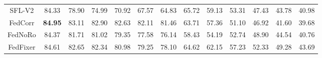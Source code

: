 \begin{table}[t]
\begin{center}
{\begin{tabular}{c|cccccccccccc}
SFL-V2                                & \multicolumn{1}{c}{84.33}      & \multicolumn{1}{c}{78.90}      & \multicolumn{1}{c}{74.99}      & \multicolumn{1}{c}{70.92}      & \multicolumn{1}{c}{67.57}      & \multicolumn{1}{c}{64.83}      & \multicolumn{1}{c}{65.72}      & \multicolumn{1}{c}{59.13}      & \multicolumn{1}{c}{53.31}      & \multicolumn{1}{c}{47.43}      & \multicolumn{1}{c}{43.78}    &   \multicolumn{1}{c}{40.98}  \\ 
FedCorr                                          & \multicolumn{1}{c}{\textbf{84.95}}      & \multicolumn{1}{c}{83.11}      & \multicolumn{1}{c}{82.90}      & \multicolumn{1}{c}{82.63}      & \multicolumn{1}{c}{82.11}      & \multicolumn{1}{c}{81.46}      & \multicolumn{1}{c}{63.71}      & \multicolumn{1}{c}{57.36}      & \multicolumn{1}{c}{51.10}      & \multicolumn{1}{c}{46.92}      & \multicolumn{1}{c}{41.60}    &   \multicolumn{1}{c}{39.68}  \\ 
FedNoRo                                          & \multicolumn{1}{c}{84.37}      & \multicolumn{1}{c}{81.71}      & \multicolumn{1}{c}{81.02}      & \multicolumn{1}{c}{79.35}      & \multicolumn{1}{c}{77.58}      & \multicolumn{1}{c}{76.14}      & \multicolumn{1}{c}{58.43}      & \multicolumn{1}{c}{54.19}      & \multicolumn{1}{c}{52.74}      & \multicolumn{1}{c}{48.90}      & \multicolumn{1}{c}{44.54}    &    \multicolumn{1}{c}{40.76} \\ 

FedFixer                                        & \multicolumn{1}{c}{84.61}      & \multicolumn{1}{c}{82.65}      & \multicolumn{1}{c}{82.34}      & \multicolumn{1}{c}{80.98}      & \multicolumn{1}{c}{79.25}      & \multicolumn{1}{c}{78.10}      & \multicolumn{1}{c}{64.62}      & \multicolumn{1}{c}{62.15}      & \multicolumn{1}{c}{57.23}      & \multicolumn{1}{c}{52.33}      & \multicolumn{1}{c}{49.28}    &    \multicolumn{1}{c}{43.69} \\ \hline

\end{tabular}
}
\label{table:compare cifar10}
\end{center}
\end{table}



